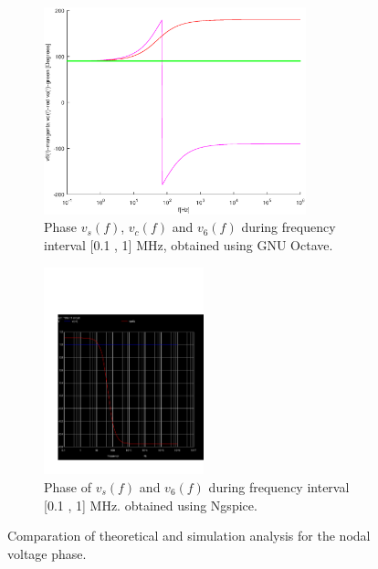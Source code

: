 \begin{figure}[H]

\begin{subfigure}{0.5\textwidth}
\includegraphics[width=0.9\linewidth, height=6cm]{phase.eps} 
\caption{Phase $v_s(f)$,  $v_c(f)$  and $v_6(f)$ during frequency interval [0.1 , 1] MHz, obtained using GNU Octave.}
\label{fig:theo_third}
\end{subfigure}
\begin{subfigure}{0.5\textwidth}
\includegraphics[width=0.9\linewidth, height=6cm]{acp.pdf}
\caption{Phase of $v_s(f)$ and $v_6(f)$ during frequency interval [0.1 , 1] MHz. obtained using Ngspice.}
\label{fig:total}
\end{subfigure}

\caption{Comparation of theoretical and simulation analysis for the nodal voltage phase.}
\label{fig:compar_4}
\end{figure}


















